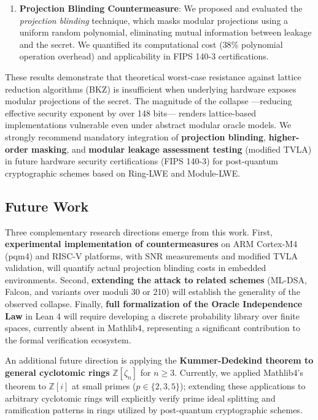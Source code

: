 \documentclass[11pt,a4paper]{article}
\theoremstyle{plain}
\theoremstyle{definition}
\numberwithin{equation}{section}
\newcommand{\ZZ}{\mathbb{Z}}
\begin{document}
\begin{enumerate}
    \item \textbf{Projection Blinding Countermeasure}: We proposed and evaluated the \emph{projection blinding} technique, which masks modular projections using a uniform random polynomial, eliminating mutual information between leakage and the secret. We quantified its computational cost ($38\%$ polynomial operation overhead) and applicability in FIPS 140-3 certifications.
\end{enumerate}

These results demonstrate that theoretical worst-case resistance against lattice reduction algorithms (BKZ) is insufficient when underlying hardware exposes modular projections of the secret. The magnitude of the collapse —reducing effective security exponent by over 148 bits— renders lattice-based implementations vulnerable even under abstract modular oracle models. We strongly recommend mandatory integration of \textbf{projection blinding}, \textbf{higher-order masking}, and \textbf{modular leakage assessment testing} (modified TVLA) in future hardware security certifications (FIPS 140-3) for post-quantum cryptographic schemes based on Ring-LWE and Module-LWE.

\subsection*{Future Work}

Three complementary research directions emerge from this work. First, \textbf{experimental implementation of countermeasures} on ARM Cortex-M4 (pqm4) and RISC-V platforms, with SNR measurements and modified TVLA validation, will quantify actual projection blinding costs in embedded environments. Second, \textbf{extending the attack to related schemes} (ML-DSA, Falcon, and variants over moduli 30 or 210) will establish the generality of the observed collapse. Finally, \textbf{full formalization of the Oracle Independence Law} in Lean 4 will require developing a discrete probability library over finite spaces, currently absent in Mathlib4, representing a significant contribution to the formal verification ecosystem.

An additional future direction is applying the \textbf{Kummer-Dedekind theorem to general cyclotomic rings} $\ZZ[\zeta_n]$ for $n \ge 3$. Currently, we applied Mathlib4's theorem to $\ZZ[i]$ at small primes ($p \in \{2, 3, 5\}$); extending these applications to arbitrary cyclotomic rings will explicitly verify prime ideal splitting and ramification patterns in rings utilized by post-quantum cryptographic schemes.
\end{document}
